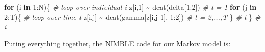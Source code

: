 \documentclass[
  12pt,
]{krantz}
\newenvironment{Shaded}{\begin{snugshade}}{\end{snugshade}}
\newcommand{\CommentTok}[1]{\textcolor[rgb]{0.56,0.35,0.01}{\textit{#1}}}
\newcommand{\ControlFlowTok}[1]{\textcolor[rgb]{0.13,0.29,0.53}{\textbf{#1}}}
\newcommand{\DecValTok}[1]{\textcolor[rgb]{0.00,0.00,0.81}{#1}}
\newcommand{\FunctionTok}[1]{\textcolor[rgb]{0.00,0.00,0.00}{#1}}
\newcommand{\NormalTok}[1]{#1}
\newcommand{\SpecialCharTok}[1]{\textcolor[rgb]{0.00,0.00,0.00}{#1}}
\begin{document}
\begin{Shaded}
\begin{Highlighting}[]
\ControlFlowTok{for}\NormalTok{ (i }\ControlFlowTok{in} \DecValTok{1}\SpecialCharTok{:}\NormalTok{N)\{ }\CommentTok{\# loop over individual i}
\NormalTok{  z[i,}\DecValTok{1}\NormalTok{] }\SpecialCharTok{\textasciitilde{}} \FunctionTok{dcat}\NormalTok{(delta[}\DecValTok{1}\SpecialCharTok{:}\DecValTok{2}\NormalTok{]) }\CommentTok{\# t = 1}
  \ControlFlowTok{for}\NormalTok{ (j }\ControlFlowTok{in} \DecValTok{2}\SpecialCharTok{:}\NormalTok{T)\{ }\CommentTok{\# loop over time t}
\NormalTok{    z[i,j] }\SpecialCharTok{\textasciitilde{}} \FunctionTok{dcat}\NormalTok{(gamma[z[i,j}\DecValTok{{-}1}\NormalTok{], }\DecValTok{1}\SpecialCharTok{:}\DecValTok{2}\NormalTok{]) }\CommentTok{\# t = 2,...,T}
\NormalTok{  \} }\CommentTok{\# t}
\NormalTok{\} }\CommentTok{\# i}
\end{Highlighting}
\end{Shaded}

Puting everything together, the NIMBLE code for our Markov model is:
\end{document}
